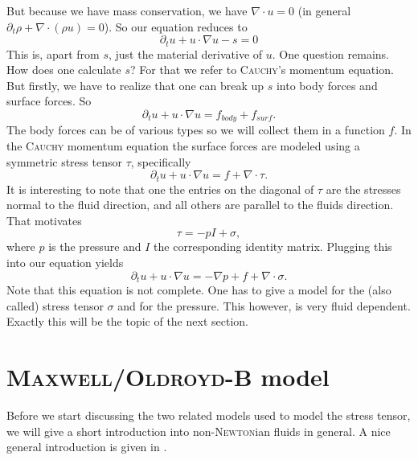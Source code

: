 \documentclass[12pt,a4paper,twoside, open=right]{scrreprt}
\theoremstyle{definition}
\theoremstyle{plain}
\begin{document}
But because we have mass conservation, we have $\nabla\cdot u =0$ (in general $\partial_t \rho + \nabla\cdot(\rho u) =0$). So our equation reduces to 
\begin{equation}
    \partial_t u+ u\cdot \nabla u -s =0
\end{equation}
This is, apart from $s$, just the material derivative of $u$.
One question remains. How does one calculate $s$? For that we refer to \textsc{Cauchy}'s momentum equation. But firstly, we have to realize that one can break up $s$ into body forces and surface forces. So 
\begin{equation}
   \partial_t u + u\cdot \nabla u = f_{body} +f_{surf} .
\end{equation}
The body forces can be of various types so we will collect them in a function $f$. In the \textsc{Cauchy} momentum equation the surface forces are modeled using a symmetric stress tensor $\tau$, specifically
\begin{equation}
    \partial_t u + u\cdot \nabla u = f + \nabla\cdot\tau.
\end{equation}
It is interesting to note that one the entries on the diagonal of $\tau$ are the stresses normal to the fluid direction, and all others are parallel to the fluids direction. That motivates 
\begin{equation}
    \tau = -pI+\sigma,
\end{equation}
where $p$ is the pressure and $I$ the corresponding identity matrix. Plugging this into our equation yields
\begin{equation}
    \partial_t u + u\cdot \nabla u = -\nabla p + f + \nabla\cdot\sigma.
\end{equation}
Note that this equation is not complete. One has to give a model for the (also called) stress tensor $\sigma$ and for the pressure. This however, is very fluid dependent. Exactly this will be the topic of the next section.
\section{\textsc{Maxwell/Oldroyd-B} model}
Before we start discussing the two related models used to model the stress tensor, we will give a short introduction into non-\textsc{Newton}ian fluids in general. A nice general introduction is given in \cite{Ouellette2013}.
\end{document}
